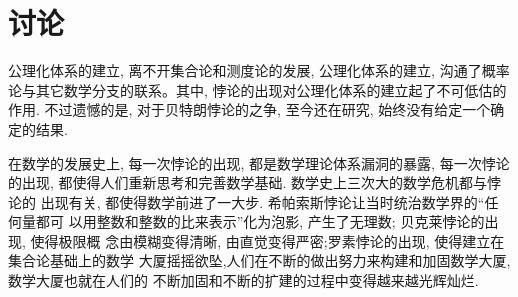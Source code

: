 \section*{讨论}

公理化体系的建立, 离不开集合论和测度论的发展, 公理化体系的建立, 沟通了概率
论与其它数学分支的联系。其中, 悖论的出现对公理化体系的建立起了不可低估的作用.
不过遗憾的是, 对于贝特朗悖论的之争, 至今还在研究, 始终没有给定一个确定的结果.
\par 在数学的发展史上, 每一次悖论的出现, 都是数学理论体系漏洞的暴露, 每一次悖论
的出现, 都使得人们重新思考和完善数学基础. 数学史上三次大的数学危机都与悖论的
出现有关, 都使得数学前进了一大步. 希帕索斯悖论让当时统治数学界的“任何量都可
以用整数和整数的比来表示”化为泡影, 产生了无理数; 贝克莱悖论的出现, 使得极限概
念由模糊变得清晰, 由直觉变得严密;罗素悖论的出现, 使得建立在集合论基础上的数学
大厦摇摇欲坠,人们在不断的做出努力来构建和加固数学大厦, 数学大厦也就在人们的
不断加固和不断的扩建的过程中变得越来越光辉灿烂.